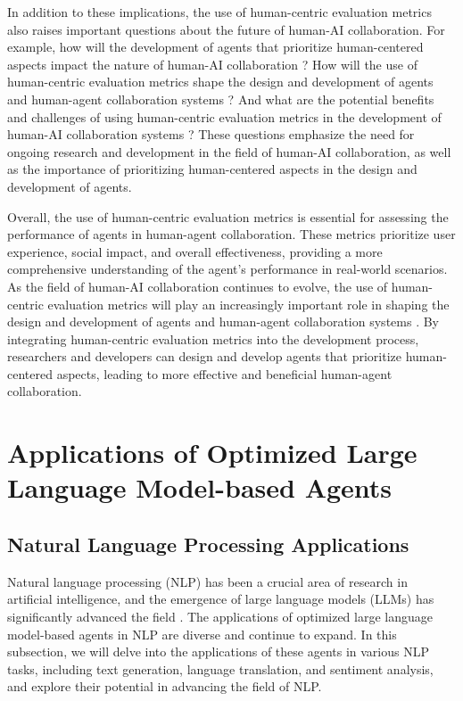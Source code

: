 \documentclass[11pt]{article}
\begin{document}
In addition to these implications, the use of human-centric evaluation metrics also raises important questions about the future of human-AI collaboration. For example, how will the development of agents that prioritize human-centered aspects impact the nature of human-AI collaboration \cite{ref221}? How will the use of human-centric evaluation metrics shape the design and development of agents and human-agent collaboration systems \cite{ref217}? And what are the potential benefits and challenges of using human-centric evaluation metrics in the development of human-AI collaboration systems \cite{ref203}? These questions emphasize the need for ongoing research and development in the field of human-AI collaboration, as well as the importance of prioritizing human-centered aspects in the design and development of agents.

Overall, the use of human-centric evaluation metrics is essential for assessing the performance of agents in human-agent collaboration. These metrics prioritize user experience, social impact, and overall effectiveness, providing a more comprehensive understanding of the agent's performance in real-world scenarios. As the field of human-AI collaboration continues to evolve, the use of human-centric evaluation metrics will play an increasingly important role in shaping the design and development of agents and human-agent collaboration systems \cite{ref210}. By integrating human-centric evaluation metrics into the development process, researchers and developers can design and develop agents that prioritize human-centered aspects, leading to more effective and beneficial human-agent collaboration.

\section{Applications of Optimized Large Language Model-based Agents}

\subsection{Natural Language Processing Applications}

Natural language processing (NLP) has been a crucial area of research in artificial intelligence, and the emergence of large language models (LLMs) has significantly advanced the field \cite{ref222}. The applications of optimized large language model-based agents in NLP are diverse and continue to expand. In this subsection, we will delve into the applications of these agents in various NLP tasks, including text generation, language translation, and sentiment analysis, and explore their potential in advancing the field of NLP.
\end{document}
